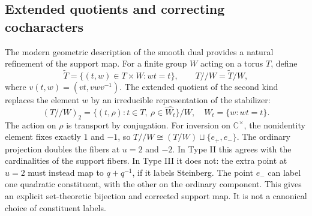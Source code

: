 \subsection{Extended quotients and correcting cocharacters}\label{subsec:extended-quotient}
The modern geometric description of the smooth dual provides a natural refinement of the support map. For a finite group $W$ acting on a torus $T$, define
\[\widetilde T=\{(t,w)\in T\times W:wt=t\},\qquad T//W=\widetilde T/W,\]
where $v(t,w)=(vt,vwv^{-1})$. The extended quotient of the second kind replaces the element $w$ by an irreducible representation of the stabilizer:
\[(T//W)_2=\{(t,\rho):t\in T,\ \rho\in\widehat{W_t}\}/W,\quad W_t=\{w:wt=t\}.\]
The action on $\rho$ is transport by conjugation. For inversion on $\mathbb C^\times$, the nonidentity element fixes exactly $1$ and $-1$, so $T//W\cong(T/W)\sqcup\{e_+,e_-\}$. The ordinary projection doubles the fibers at $u=2$ and $-2$. In Type II this agrees with the cardinalities of the support fibers. In Type III it does not: the extra point at $u=2$ must instead map to $q+q^{-1}$, if it labels Steinberg. The point $e_-$ can label one quadratic constituent, with the other on the ordinary component. This gives an explicit set-theoretic bijection and corrected support map. It is not a canonical choice of constituent labels.

